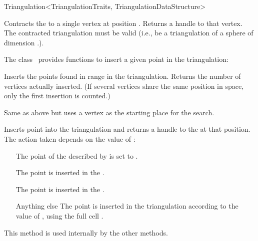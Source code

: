 \begin{ccRefClass}{Triangulation<TriangulationTraits, TriangulationDataStructure>}
\begin{ccAdvanced}

{Contracts the  to a single vertex at position . Returns a
handle to that vertex. \ccPrecond The contracted triangulation must be valid
({i.e.}, be a triangulation of a sphere of dimension
\ccVar.).}

\end{ccAdvanced}



The class \ccRefName\ provides functions to insert a given point in the
triangulation:

%
{Inserts the points found in range \ccc{[s,e)} in the triangulation. Returns
the number of vertices actually inserted. (If several vertices share the
same position in space, only the first insertion is counted.)}


%
{Same as above but uses a vertex  as the starting place for the search.}

\begin{ccAdvanced}

 {Inserts
point  into the triangulation and returns a handle to the
 at that position. The action taken depends on the value of
:\begin{itemize} \item[\ccc{ON_VERTEX}] The point of the
 described by  is set to . \item[\ccc{IN_FACE}]
The point  is inserted in the . \item[\ccc{IN_FACET}]
The point  is inserted in the . \item[Anything else]
The point  is inserted in the triangulation according to the value
of , using the full cell .\end{itemize} This method is used
internally by the other  methods.}


\end{ccAdvanced}
\end{ccRefClass}
